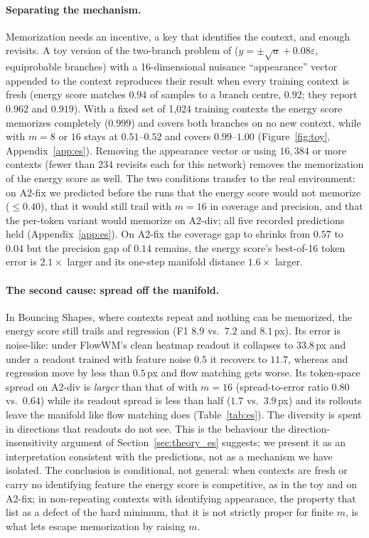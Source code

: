 \paragraph{Separating the mechanism.}
Memorization needs an incentive, a key that identifies the context, and enough revisits. A toy version of the two-branch problem of \citet{makabe2026esp} ($y = \pm\sqrt{u} + 0.08\varepsilon$, equiprobable branches) with a 16-dimensional nuisance ``appearance'' vector appended to the context reproduces their result when every training context is fresh (energy score matches $0.94$ of samples to a branch centre, \nom{} $0.92$; they report $0.962$ and $0.919$). With a fixed set of 1{,}024 training contexts the energy score memorizes completely ($0.999$) and covers both branches on no new context, while \nom{} with $m = 8$ or $16$ stays at $0.51$--$0.52$ and covers $0.99$--$1.00$ (Figure~\ref{fig:toy}, Appendix~\ref{app:es}). Removing the appearance vector or using $16{,}384$ or more contexts (fewer than $234$ revisits each for this network) removes the memorization of the energy score as well. The two conditions transfer to the real environment: on A2-fix we predicted before the runs that the energy score would not memorize ($\le 0.40$), that it would still trail \imlewm{} with $m{=}16$ in coverage and precision, and that the per-token variant would memorize on A2-div; all five recorded predictions held (Appendix~\ref{app:es}). On A2-fix the coverage gap to \imlewm{} shrinks from $0.57$ to $0.04$ but the precision gap of $0.14$ remains, the energy score's best-of-16 token error is $2.1\times$ larger and its one-step manifold distance $1.6\times$ larger.

\paragraph{The second cause: spread off the manifold.}
In Bouncing Shapes, where contexts repeat and nothing can be memorized, the energy score still trails \imlewm{} and regression (F1 $8.9$ vs.\ $7.2$ and $8.1$\,px). Its error is noise-like: under FlowWM's clean heatmap readout it collapses to $33.8$\,px and under a readout trained with feature noise $0.5$ it recovers to $11.7$, whereas \imlewm{} and regression move by less than $0.5$\,px and flow matching gets worse. Its token-space spread on A2-div is \emph{larger} than that of \imlewm{} with $m{=}16$ (spread-to-error ratio $0.80$ vs.\ $0.64$) while its readout spread is less than half ($1.7$ vs.\ $3.9$\,px) and its rollouts leave the manifold like flow matching does (Table~\ref{tab:es}). The diversity is spent in directions that readouts do not see. This is the behaviour the direction-insensitivity argument of Section~\ref{sec:theory_es} suggests; we present it as an interpretation consistent with the predictions, not as a mechanism we have isolated. The conclusion is conditional, not general: when contexts are fresh or carry no identifying feature the energy score is competitive, as in the toy and on A2-fix; in non-repeating contexts with identifying appearance, the property that \citet{makabe2026esp} list as a defect of the hard minimum, that it is not strictly proper for finite $m$, is what lets \nom{} escape memorization by raising $m$.
